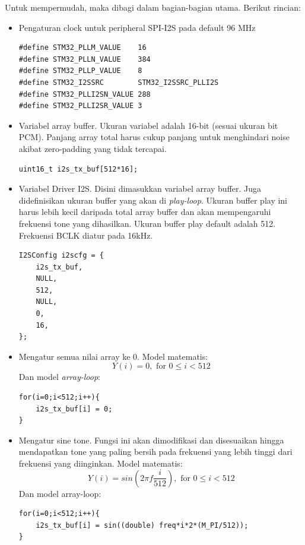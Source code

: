 \documentclass[12pt,]{article}
\begin{document}
	Untuk mempermudah, maka dibagi dalam bagian-bagian utama.
	Berikut rincian:
	\begin{itemize}
		\item Pengaturan clock untuk peripheral SPI-I2S pada default 96 MHz
		\begin{verbatim}
#define STM32_PLLM_VALUE    16
#define STM32_PLLN_VALUE    384
#define STM32_PLLP_VALUE    8
#define STM32_I2SSRC        STM32_I2SSRC_PLLI2S
#define STM32_PLLI2SN_VALUE 288
#define STM32_PLLI2SR_VALUE 3
		\end{verbatim}
		
		\item Variabel array buffer.
		Ukuran variabel adalah 16-bit (sesuai ukuran bit PCM).
		Panjang array total harus cukup panjang untuk menghindari
		noise akibat zero-padding yang tidak tercapai. 
		\begin{verbatim}
uint16_t i2s_tx_buf[512*16];
		\end{verbatim}
		
		\item Variabel Driver I2S.
		Disini dimasukkan variabel array buffer.
		Juga didefinisikan ukuran buffer yang akan di \textit{play-loop}.
		Ukuran buffer play ini harus lebih kecil daripada total array buffer
		dan akan mempengaruhi frekuensi tone yang dihasilkan.
		Ukuran buffer play default adalah 512.
		Frekuensi BCLK diatur pada 16kHz.
		\begin{verbatim}
I2SConfig i2scfg = {
	i2s_tx_buf,
	NULL,
	512,
	NULL,
	0,
	16,
};
		\end{verbatim}
		
		\newpage
		\item Mengatur semua nilai array ke 0.
		Model matematis:
		\[ Y(i) = 0, \text{ for } 0 \leq i < 512 \]
		Dan model \textit{array-loop}:
		\begin{verbatim}
for(i=0;i<512;i++){
	i2s_tx_buf[i] = 0;
}
		\end{verbatim}
		
		\item Mengatur sine tone.
		Fungsi ini akan dimodifikasi dan disesuaikan hingga mendapatkan
		tone yang paling bersih pada frekuensi yang lebih tinggi
		dari frekuensi yang diinginkan.
		Model matematis:
		\[ Y(i) = sin(2\pi f \frac{i}{512}), \text{ for } 0 \leq i < 512 \]
		Dan model array-loop:
		\begin{verbatim}
for(i=0;i<512;i++){
	i2s_tx_buf[i] = sin((double) freq*i*2*(M_PI/512));
}
		\end{verbatim}
		

\end{itemize}
\end{document}
